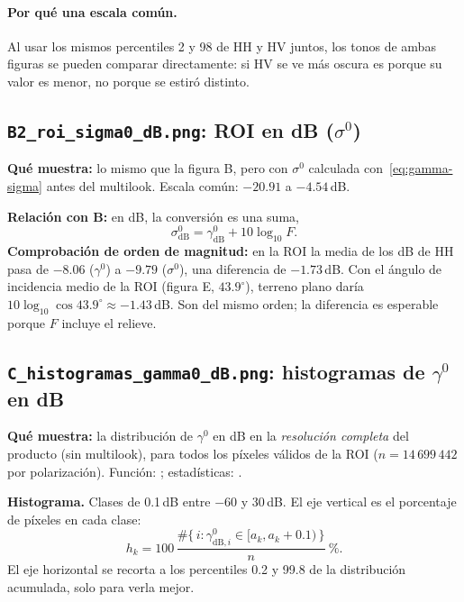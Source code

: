 \documentclass[11pt,a4paper]{article}
\newcommand{\gz}{\ensuremath{\gamma^{0}}}
\newcommand{\sz}{\ensuremath{\sigma^{0}}}
\begin{document}
\paragraph{Por qué una escala común.} Al usar los mismos percentiles 2 y 98 de HH y HV juntos, los tonos de
ambas figuras se pueden comparar directamente: si HV se ve más oscura es porque su valor es menor, no porque
se estiró distinto.

\subsection{\texttt{B2\_roi\_sigma0\_dB.png}: ROI en dB (\sz)}

\textbf{Qué muestra:} lo mismo que la figura B, pero con \sz{} calculada con~\eqref{eq:gamma-sigma} antes del multilook. Escala común:
$-20.91$ a $-4.54$\,dB.

\textbf{Relación con B:} en dB, la conversión es una suma,
\begin{equation}
  \sigma^0_{\text{dB}} = \gamma^0_{\text{dB}} + 10\log_{10} F .
\end{equation}
\textbf{Comprobación de orden de magnitud:} en la ROI la media de los dB de HH pasa de $-8.06$ (\gz) a $-9.79$ (\sz), una diferencia de
$-1.73$\,dB. Con el ángulo de incidencia medio de la ROI (figura E, $43.9^\circ$), terreno plano daría
$10\log_{10}\cos 43.9^\circ \approx -1.43$\,dB. Son del mismo orden; la diferencia es esperable porque $F$ incluye el relieve.

\subsection{\texttt{C\_histogramas\_gamma0\_dB.png}: histogramas de \gz{} en dB}

\textbf{Qué muestra:} la distribución de \gz{} en dB en la \emph{resolución completa} del producto (sin multilook), para todos los
píxeles válidos de la ROI ($n = 14\,699\,442$ por polarización). Función: ; estadísticas: .

\textbf{Histograma.} Clases de 0.1\,dB entre $-60$ y $30$\,dB. El eje vertical es el porcentaje de píxeles en cada clase:
\begin{equation}
  h_k = 100\,\frac{\#\{\,i : \gamma^0_{\text{dB},i} \in [a_k, a_k + 0.1)\,\}}{n}\ \mathrm{\%}.
\end{equation}
El eje horizontal se recorta a los percentiles 0.2 y 99.8 de la distribución acumulada, solo para verla mejor.
\end{document}
